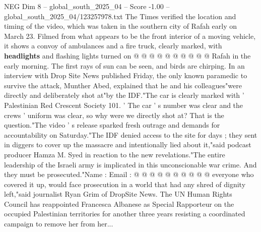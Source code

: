 \begin{textsample}{NEG Dim 8 – global\_south\_2025\_04 – Score -1.00 – global\_south\_2025\_04/123257978.txt}
The Times verified the location and timing of the video, which was taken in the southern city of Rafah early on March 23.
Filmed from what appears to be the front interior of a moving vehicle, it shows a convoy of ambulances and a fire truck, clearly marked, with \textbf{headlights} and flashing lights turned on @ @ @ @ @ @ @ @ @ @ Rafah in the early morning.
The first rays of sun can be seen, and birds are chirping.
In an interview with Drop Site News published Friday, the only known paramedic to survive the attack, Munther Abed, explained that he and his colleagues"were directly and deliberately shot at"by the IDF."The car is clearly marked with ' Palestinian Red Crescent Society 101. ' The car ' s number was clear and the crews ' uniform was clear, so why were we directly shot at?
That is the question."The video ' s release sparked fresh outrage and demands for accountability on Saturday."The IDF denied access to the site for days ; they sent in diggers to cover up the massacre and intentionally lied about it,"said podcast producer Hamza M.
Syed in reaction to the new revelations."The entire leadership of the Israeli army is implicated in this unconscionable war crime.
And they must be prosecuted."Name : Email : @ @ @ @ @ @ @ @ @ @ everyone who covered it up, would face prosecution in a world that had any shred of dignity left,"said journalist Ryan Grim of DropSite News.
The UN Human Rights Council has reappointed Francesca Albanese as Special Rapporteur on the occupied Palestinian territories for another three years resisting a coordinated campaign to remove her from her...

\end{textsample}
